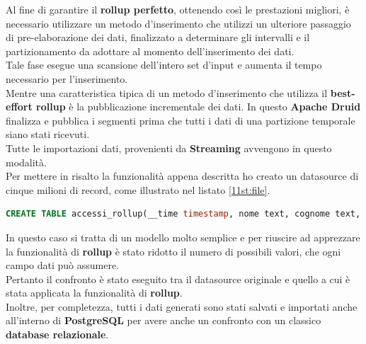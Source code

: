 \noindent
Al fine di garantire il \textbf{rollup perfetto}, ottenendo così le prestazioni migliori, è necessario utilizzare un metodo d'inserimento 
che utilizzi un ulteriore passaggio di pre-elaborazione dei dati, finalizzato a determinare gli intervalli e il partizionamento da adottare 
al momento dell'inserimento dei dati. \\
Tale fase esegue una scansione dell'intero set d'input e aumenta il tempo necessario per l'inserimento.
\\Mentre una caratteristica tipica di un metodo d'inserimento che utilizza il \textbf{best-effort rollup} è la pubblicazione incrementale dei dati.
In questo \textbf{Apache Druid} finalizza e pubblica i segmenti prima che tutti i dati di una partizione temporale siano stati ricevuti. 
 \pagebreak   \\Tutte le importazioni dati, provenienti da \textbf{Streaming} avvengono in questo modalità.\\
\noindent Per mettere in risalto la funzionalità appena descritta ho creato un \gls{datasource}{} di cinque milioni di record, come illustrato nel listato \ref{11st:file}.
\begin{lstlisting}[language=SQL,label=11st:file]
    CREATE TABLE accessi_rollup(__time timestamp, nome text, cognome text, citta text, stato text, datan date, istruzione text, hobby text)
\end{lstlisting}
In questo caso si tratta di un modello molto semplice 
e per riuscire ad apprezzare la funzionalità di \textbf{rollup} è stato ridotto
il numero di possibili valori, che ogni campo dati può assumere.\\
Pertanto il confronto è stato eseguito tra il \gls{datasource}{} originale e quello a cui è stata applicata la funzionalità di \textbf{rollup}.\\
Inoltre, per completezza, tutti i dati generati sono stati salvati e importati anche all'interno di \textbf{PostgreSQL} per avere 
anche un confronto con un classico \textbf{database relazionale}.

\pagebreak
